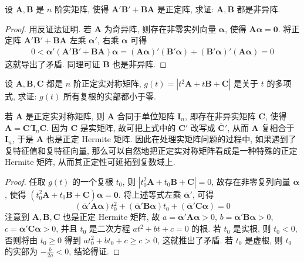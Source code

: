 \documentclass[../../main.tex]{subfiles}
\begin{document}
\begin{proposition}\label{proposition:两个正定阵和非异阵的关系}
设 \(\boldsymbol{A},\boldsymbol{B}\) 是 \(n\) 阶实矩阵, 使得 \(\boldsymbol{A}'\boldsymbol{B}'+\boldsymbol{B}\boldsymbol{A}\) 是正定阵, 求证: \(\boldsymbol{A},\boldsymbol{B}\) 都是非异阵.
\end{proposition}
\begin{proof}
用反证法证明. 若 \(\boldsymbol{A}\) 为奇异阵, 则存在非零实列向量 \(\boldsymbol{\alpha}\), 使得 \(\boldsymbol{A}\boldsymbol{\alpha}=\boldsymbol{0}\). 将正定阵 \(\boldsymbol{A}'\boldsymbol{B}'+\boldsymbol{B}\boldsymbol{A}\) 左乘 \(\boldsymbol{\alpha}'\), 右乘 \(\boldsymbol{\alpha}\) 可得
\begin{align*}
0<\boldsymbol{\alpha}'(\boldsymbol{A}'\boldsymbol{B}'+\boldsymbol{B}\boldsymbol{A})\boldsymbol{\alpha}=(\boldsymbol{A}\boldsymbol{\alpha})'(\boldsymbol{B}'\boldsymbol{\alpha})+(\boldsymbol{B}'\boldsymbol{\alpha})'(\boldsymbol{A}\boldsymbol{\alpha})= 0
\end{align*}
这就导出了矛盾. 同理可证 \(\boldsymbol{B}\) 也是非异阵. 
\end{proof}

\begin{example}
设 \(\boldsymbol{A},\boldsymbol{B},\boldsymbol{C}\) 都是 \(n\) 阶正定实对称矩阵, \(g(t)=|t^2\boldsymbol{A}+t\boldsymbol{B}+\boldsymbol{C}|\) 是关于 \(t\) 的多项式, 求证: \(g(t)\) 所有复根的实部都小于零.
\end{example}
\begin{remark}
若 \(\boldsymbol{A}\) 是正定实对称矩阵, 则 \(\boldsymbol{A}\) 合同于单位矩阵 \(\boldsymbol{I}_n\), 即存在非异实矩阵 \(\boldsymbol{C}\), 使得 \(\boldsymbol{A}=\boldsymbol{C}'\boldsymbol{I}_n\boldsymbol{C}\). 因为 \(\boldsymbol{C}\) 是实矩阵, 故可把上式中的 \(\boldsymbol{C}'\) 改写成 \(\overline{\boldsymbol{C}}'\), 从而 \(\boldsymbol{A}\) 复相合于 \(\boldsymbol{I}_n\), 于是 \(\boldsymbol{A}\) 也是正定 Hermite 矩阵. 因此在处理实矩阵问题的过程中, 如果遇到了复特征值和复特征向量, 那么可以自然地把正定实对称矩阵看成是一种特殊的正定 Hermite 矩阵, 从而其正定性可延拓到复数域上. 
\end{remark}
\begin{proof}
任取 \(g(t)\) 的一个复根 \(t_0\), 则 \(|t_0^2\boldsymbol{A}+t_0\boldsymbol{B}+\boldsymbol{C}| = 0\), 故存在非零复列向量 \(\boldsymbol{\alpha}\), 使得 \((t_0^2\boldsymbol{A}+t_0\boldsymbol{B}+\boldsymbol{C})\boldsymbol{\alpha}=\boldsymbol{0}\). 将上述等式左乘 \(\overline{\boldsymbol{\alpha}}'\), 可得
\[(\overline{\boldsymbol{\alpha}}'\boldsymbol{A}\boldsymbol{\alpha})t_0^2+(\overline{\boldsymbol{\alpha}}'\boldsymbol{B}\boldsymbol{\alpha})t_0+(\overline{\boldsymbol{\alpha}}'\boldsymbol{C}\boldsymbol{\alpha}) = 0\]
注意到 \(\boldsymbol{A},\boldsymbol{B},\boldsymbol{C}\) 也是正定 Hermite 矩阵, 故 \(a=\overline{\boldsymbol{\alpha}}'\boldsymbol{A}\boldsymbol{\alpha}>0\), \(b=\overline{\boldsymbol{\alpha}}'\boldsymbol{B}\boldsymbol{\alpha}>0\), \(c=\overline{\boldsymbol{\alpha}}'\boldsymbol{C}\boldsymbol{\alpha}>0\), 并且 \(t_0\) 是二次方程 \(at^2 + bt + c = 0\) 的根. 若 \(t_0\) 是实根, 则 \(t_0<0\), 否则将由 \(t_0\geq0\) 得到 \(at_0^2+bt_0 + c\geq c>0\), 这就推出了矛盾. 若 \(t_0\) 是虚根, 则 \(t_0\) 的实部为 \(-\frac{b}{2a}<0\), 结论得证. 
\end{proof}
\end{document}
